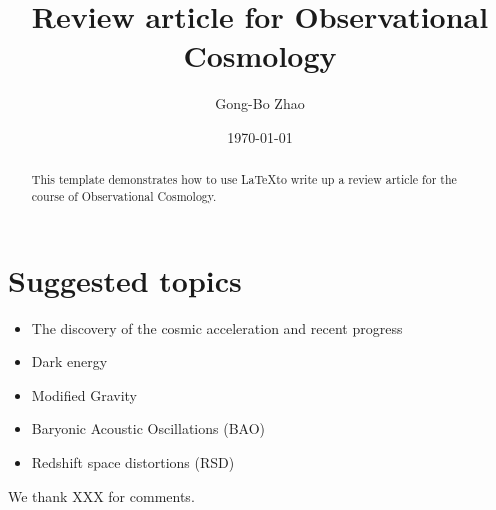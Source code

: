 \documentclass[prd,twocolumn,showpacs,preprintnumbers,amsmath,amssymb,superscriptaddress,nofootinbib,english]{revtex4-1}
\begin{document}
\title{Review article for Observational Cosmology}

\author{Gong-Bo Zhao}





\begin{abstract}
This template demonstrates how to use \LaTeX to write up a review article for the course of Observational Cosmology.
\end{abstract}

\date{\today}

\maketitle

\section{Suggested topics}

\begin{itemize}
\item The discovery of the cosmic acceleration and recent progress \cite{Riess,Perlmutter}
\item Dark energy \cite{Weinberg,Zhao}
\item Modified Gravity \cite{Weinberg,MG}
\item Baryonic Acoustic Oscillations (BAO) \cite{BAO,DR12,DR14BAO,DR14Q}
\item Redshift space distortions (RSD) \cite{RSD,DR12,DR14Q}
\end{itemize}



\acknowledgments We thank XXX for comments.
\end{document}
